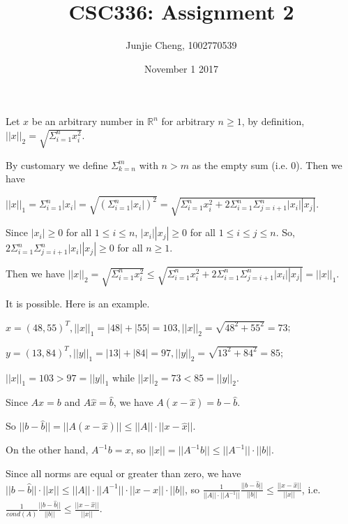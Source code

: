 \documentclass[11pt, answers]{exam}
\title{CSC336: Assignment 2}
\author{Junjie Cheng, 1002770539}
\date{November 1 2017}
\theoremstyle{plain}
\theoremstyle{definition}
\newcommand{\R}{\mathbb{R}}
\begin{document}
\maketitle

\begin{questions}
\question %
Let $x$ be an arbitrary number in $\R^n$ for arbitrary $n \ge 1$, by definition, $||x||_2 = \sqrt{\Sigma_{i=1}^n x_i^2} $. 

By customary we define $\Sigma_{k=n}^m$ with $n>m$ as the empty sum (i.e. $0$). Then we have

$||x||_1 = \Sigma_{i=1}^n |x_i| = \sqrt{(\Sigma_{i=1}^n |x_i|)^2} = \sqrt{\Sigma_{i=1}^n x_i^2 + 2\Sigma_{i=1}^n \Sigma_{j=i+1}^n |x_i||x_j|}$.

Since $|x_i| \ge 0$ for all $1 \le i \le n$, $|x_i||x_j| \ge 0$ for all $1 \le i \le j \le n$. So, $2\Sigma_{i=1}^n \Sigma_{j=i+1}^n |x_i||x_j| \ge 0$ for all $n \ge 1$.

Then we have $||x||_2 = \sqrt{\Sigma_{i=1}^n x_i^2} \le \sqrt{\Sigma_{i=1}^n x_i^2 + 2\Sigma_{i=1}^n \Sigma_{j=i+1}^n |x_i||x_j|} = ||x||_1$.

\question %
It is possible. Here is an example.

$x = (48, 55)^T, ||x||_1 = |48|+|55|= 103, ||x||_2 = \sqrt{48^2+55^2} = 73$;

$y = (13, 84)^T, ||y||_1 = |13|+|84|= 97,  ||y||_2 = \sqrt{13^2+84^2} = 85$;

$||x||_1 = 103 > 97 = ||y||_1$ while $||x||_2 = 73 < 85 = ||y||_2$.

\question %
Since $Ax = b$ and $A\hat{x} = \hat{b}$, we have
$A(x-\hat{x}) = b - \hat{b}$. 

So $||b-\hat{b}|| = ||A(x-\hat{x})|| \le ||A||\cdot||x-\hat{x}||$.

On the other hand, $A^{-1}b = x$, so $||x|| = ||A^{-1}b|| \le ||A^{-1}||\cdot||b||$.

Since all norms are equal or greater than zero, we have $||b-\hat{b}|| \cdot ||x|| \le ||A||\cdot||A^{-1}|| \cdot ||x-\hat{x}|| \cdot ||b||$, so $\frac{1}{||A||\cdot||A^{-1}||}\frac{||b-\hat{b}||}{||b||} \le \frac{||x-\hat{x}||}{||x||}$, i.e. $ \frac{1}{cond(A)}\frac{||b-\hat{b}||}{||b||} \le \frac{||x-\hat{x}||}{||x||}$.

\question %
\end{questions}
\end{document}
